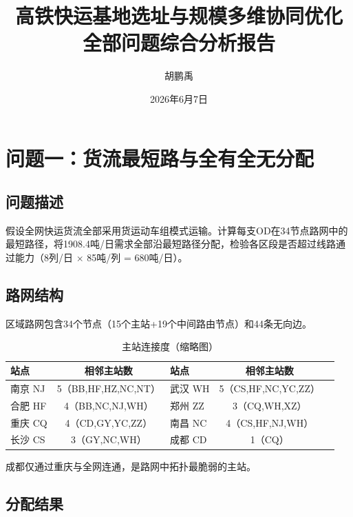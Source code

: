 \documentclass[12pt,a4paper,fontset=none]{ctexart}
\begin{document}
\title{\heiti{} 高铁快运基地选址与规模多维协同优化\\[4pt]
       \large 全部问题综合分析报告}
\author{\kaishu{} 胡鹏禹}
\date{ 2026年6月7日}
\maketitle
\thispagestyle{empty}

\tableofcontents
\newpage

\section{问题一：货流最短路与全有全无分配}

\subsection{问题描述}
假设全网快运货流全部采用货运动车组模式运输。计算每支OD在34节点路网中的最短路径，将1908.4吨/日需求全部沿最短路径分配，检验各区段是否超过线路通过能力（8列/日 $\times$ 85吨/列 = 680吨/日）。

\subsection{路网结构}
区域路网包含34个节点（15个主站+19个中间路由节点）和44条无向边。

\begin{table}[H]\centering\small
\caption{主站连接度（缩略图）}\label{tab:degree}
\begin{tabular}{lclcl}
\toprule
站点 & 相邻主站数 & 站点 & 相邻主站数 \\
\midrule
南京 NJ & 5（BB,HF,HZ,NC,NT） & 武汉 WH & 5（CS,HF,NC,YC,ZZ）\\
合肥 HF & 4（BB,NC,NJ,WH） & 郑州 ZZ & 3（CQ,WH,XZ）\\
重庆 CQ & 4（CD,GY,YC,ZZ） & 南昌 NC & 4（CS,HF,NJ,WH）\\
长沙 CS & 3（GY,NC,WH） & 成都 CD & 1（CQ）\\
\bottomrule
\end{tabular}
\end{table}

成都仅通过重庆与全网连通，是路网中拓扑最脆弱的主站。

\subsection{分配结果}
\end{document}

